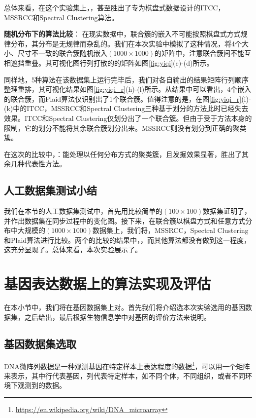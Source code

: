 总体来看，在这个实验集上，，甚至胜出了专为棋盘式数据设计的ITCC，MSSRCC和Spectral Clustering算法。

\vspace{3mm}
\textbf{随机分布下的算法比较}：
在现实数据中，联合簇的嵌入不可能按照棋盘式方式规律分布，其分布是无规律而杂乱的。我们在本次实验中模拟了这种情况，将4个大小、尺寸不一致的联合簇随机嵌入$(1000\times1000)$的矩阵中，注意联合簇间不能互相遮挡重叠。其可视化图行列打散的的矩阵如图\ref{fig:yiqi}(c)-(d)所示。

同样地，5种算法在该数据集上运行完毕后，我们对各自输出的结果矩阵行列顺序整理重排，其可视化结果如图\ref{fig:yiqi_r}(h)-(l)所示。从结果中可以看出，4个嵌入的联合簇，而Plaid算法仅识别出了1个联合簇。值得注意的是，在图\ref{fig:yiqi_r}(i)-(k)中的ITCC，MSSRCC和Spectral Clustering三种基于划分的方法此时已经失去效果。ITCC和Spectral Clustering仅划分出了一个联合簇。但由于受于方法本身的限制，它的划分不能将其余联合簇划分出来。MSSRCC则没有划分到正确的聚类簇。

在这次的比较中，：能处理以任何分布方式的聚类簇，且发掘效果显著，胜出了其余几种代表性方法。

\subsection{人工数据集测试小结}
我们在本节的人工数据集测试中，首先用比较简单的$(100\times100)$数据集证明了，并作出数据集在同步过程中的变化图。接下来，在联合簇以棋盘方式和任意方式分布中大规模的$(1000\times1000)$数据集上，我们将，MSSRCC，Spectral Clustering和Plaid算法进行比较。两个的比较的结果中，，而其他算法都没有做到这一程度，这充分显现了。总体来看，本次实验展示了。

\section{基因表达数据上的算法实现及评估}
\label{sec:gene}
在本小节中，我们将在基因数据集上对。首先我们将介绍选本次实验选用的基因数据集，之后给出，最后根据生物信息学中对基因的评价方法来说明。

\subsection{基因数据集选取}
DNA微阵列数据是一种观测基因在特定样本上表达程度的数据\footnote{\url{https://en.wikipedia.org/wiki/DNA_microarray}}，可以用一个矩阵来表示，其中行代表基因，列代表特定样本，如不同个体，不同组织，或者不同环境下观测到的数据。

